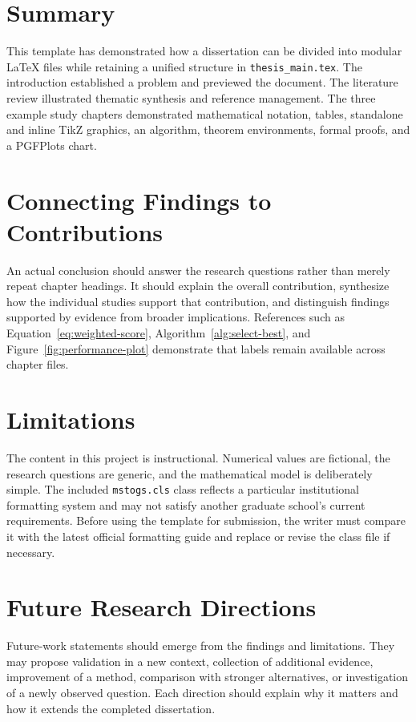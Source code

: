 \section{Summary}

This template has demonstrated how a dissertation can be divided into modular LaTeX files while retaining a unified structure in \texttt{thesis\_main.tex}. The introduction established a problem and previewed the document. The literature review illustrated thematic synthesis and reference management. The three example study chapters demonstrated mathematical notation, tables, standalone and inline TikZ graphics, an algorithm, theorem environments, formal proofs, and a PGFPlots chart.

\section{Connecting Findings to Contributions}

An actual conclusion should answer the research questions rather than merely repeat chapter headings. It should explain the overall contribution, synthesize how the individual studies support that contribution, and distinguish findings supported by evidence from broader implications. References such as Equation~\eqref{eq:weighted-score}, Algorithm~\ref{alg:select-best}, and Figure~\ref{fig:performance-plot} demonstrate that labels remain available across chapter files.

\section{Limitations}

The content in this project is instructional. Numerical values are fictional, the research questions are generic, and the mathematical model is deliberately simple. The included \texttt{mstogs.cls} class reflects a particular institutional formatting system and may not satisfy another graduate school's current requirements. Before using the template for submission, the writer must compare it with the latest official formatting guide and replace or revise the class file if necessary.

\section{Future Research Directions}

Future-work statements should emerge from the findings and limitations. They may propose validation in a new context, collection of additional evidence, improvement of a method, comparison with stronger alternatives, or investigation of a newly observed question. Each direction should explain why it matters and how it extends the completed dissertation.

